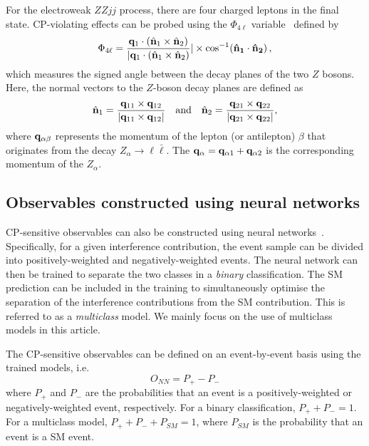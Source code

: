 \documentclass[twocolumn,preprintnumbers,superscriptaddress,nofootinbib,aps,prd,floatfix]{revtex4}
\begin{document}
For the electroweak $ZZjj$ process, there are four charged leptons in the final state. CP-violating effects can be probed using the $\Phi_{4\ell{}}$ variable~\cite{Bolognesi:2012mm,Gritsan:2016hjl} defined by
\begin{equation}
\label{eq:cpodd}
    \Phi_{4\ell{}} = \frac{{\bf q}_1 \cdot ( \hat{\bf n}_1 \times \hat{\bf n}_2)}{| {\bf q}_1 \cdot \left( \hat{\bf n}_1 \times \hat{\bf n}_2\right)}| \times {\cos}^{-1}({\bf \hat{\bf n}_1 \cdot \hat{\bf n}_2)}\,,
\end{equation}
which measures the signed angle between the decay planes of the two $Z$ bosons. Here, the normal vectors to the $Z$-boson decay planes are defined as
\begin{equation}
    {\hat{\bf n}_1} = \frac{{\bf q}_{11} \times {\bf q}_{12}}{| {\bf q}_{11} \times {\bf q}_{12}|} \quad {\text{and}} \quad \hat{\bf n}_2 = \frac{{\bf q}_{21} \times {\bf q}_{22}}{|{\bf q}_{21} \times {\bf q}_{22}|},
\end{equation}
where ${\bf q}_{\alpha\beta}$ represents the momentum of the lepton (or antilepton) $\beta$ that originates from the decay $Z_\alpha \to \ell \bar{\ell}$. The ${\bf q}_\alpha = {\bf q}_{\alpha1} + {\bf q}_{\alpha2}$ is the corresponding momentum of the $Z_\alpha$.

\subsection{Observables constructed using neural networks}

CP-sensitive observables can also be constructed using neural networks~\cite{Bhardwaj:2021ujv}. Specifically, for a given interference contribution, the event sample can be divided into positively-weighted and negatively-weighted events. The neural network can then be trained to separate the two classes in a \textit{binary} classification. The SM prediction can be included in the training to simultaneously optimise the separation of the interference contributions from the SM contribution. This is referred to as a \textit{multiclass} model. We mainly focus on the use of multiclass models in this article.

The CP-sensitive observables can be defined on an event-by-event basis using the trained models, i.e. 
\begin{equation}
O_{NN} = P_+ - P_-
\end{equation}
where $P_+$ and $P_-$ are the probabilities that an event is a positively-weighted or negatively-weighted event, respectively. For a binary classification, $P_+ + P_- = 1$. For a multiclass model, $P_+ + P_- + P_{SM} = 1$, where $P_{SM}$ is the probability that an event is a SM event.
\end{document}
